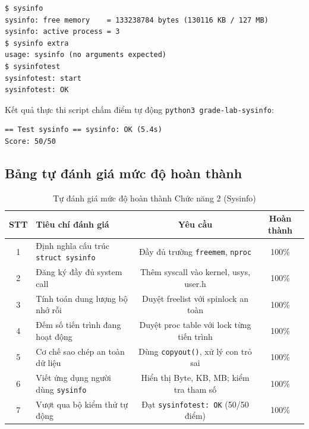\begin{center}
\begin{minipage}{0.92\textwidth}
\begin{lstlisting}[numbers=none,xleftmargin=0pt,framexleftmargin=0pt]
$ sysinfo
sysinfo: free memory    = 133238784 bytes (130116 KB / 127 MB)
sysinfo: active process = 3
$ sysinfo extra
usage: sysinfo (no arguments expected)
$ sysinfotest
sysinfotest: start
sysinfotest: OK
\end{lstlisting}
\end{minipage}
\end{center}

\noindent Kết quả thực thi script chấm điểm tự động \texttt{python3 grade-lab-sysinfo}:

\begin{center}
\begin{minipage}{0.92\textwidth}
\begin{lstlisting}[numbers=none,xleftmargin=0pt,framexleftmargin=0pt]
== Test sysinfo == sysinfo: OK (5.4s) 
Score: 50/50
\end{lstlisting}
\end{minipage}
\end{center}

\subsection{Bảng tự đánh giá mức độ hoàn thành}
\begin{table}[h!]
    \centering
    \caption{Tự đánh giá mức độ hoàn thành Chức năng 2 (Sysinfo)}
    \label{tab:self_eval_sysinfo}
    \begin{tabularx}{\textwidth}{c X c c}
        \toprule
        \textbf{STT} & \textbf{Tiêu chí đánh giá} & \textbf{Yêu cầu} & \textbf{Hoàn thành} \\
        \midrule
        1 & Định nghĩa cấu trúc \texttt{struct sysinfo} & Đầy đủ trường \texttt{freemem}, \texttt{nproc} & 100\% \\
        2 & Đăng ký đầy đủ system call & Thêm syscall vào kernel, usys, user.h & 100\% \\
        3 & Tính toán dung lượng bộ nhớ rỗi & Duyệt freelist với spinlock an toàn & 100\% \\
        4 & Đếm số tiến trình đang hoạt động & Duyệt proc table với lock từng tiến trình & 100\% \\
        5 & Cơ chế sao chép an toàn dữ liệu & Dùng \texttt{copyout()}, xử lý con trỏ sai & 100\% \\
        6 & Viết ứng dụng người dùng \texttt{sysinfo} & Hiển thị Byte, KB, MB; kiểm tra tham số & 100\% \\
        7 & Vượt qua bộ kiểm thử tự động & Đạt \texttt{sysinfotest: OK} (50/50 điểm) & 100\% \\
        \bottomrule
    \end{tabularx}
\end{table}

